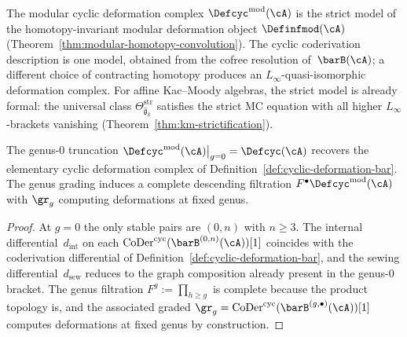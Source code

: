\begin{remark}
\label{rem:modular-cyc-strictification}
The modular cyclic deformation complex $\Defcyc^{\mathrm{mod}}(\cA)$
is the strict model of the homotopy-invariant modular deformation
object $\Definfmod(\cA)$
\textup{(}Theorem~\textup{\ref{thm:modular-homotopy-convolution})}.
The cyclic coderivation description is one model, obtained from the
cofree resolution of~$\barB(\cA)$; a different choice of
contracting homotopy produces an $L_\infty$-quasi-isomorphic
deformation complex. For affine Kac--Moody algebras, the
strict model is already formal: the universal class
$\Theta^{\mathrm{str}}_{\widehat{\mathfrak{g}}_k}$ satisfies the strict
MC equation with all higher $L_\infty$-brackets vanishing
\textup{(}Theorem~\textup{\ref{thm:km-strictification})}.
\end{remark}

\begin{proposition}
\label{prop:modular-deformation-truncation}
The genus-$0$ truncation
$\Defcyc^{\mathrm{mod}}(\cA)\big|_{g=0} = \Defcyc(\cA)$
recovers the elementary cyclic deformation complex of
Definition~\textup{\ref{def:cyclic-deformation-bar}}.
The genus grading induces a complete descending filtration
$F^{\bullet}\Defcyc^{\mathrm{mod}}(\cA)$ with
$\gr_g$ computing deformations at fixed genus.
\end{proposition}

\begin{proof}
At $g = 0$ the only stable pairs are $(0,n)$ with $n \geq 3$.
The internal differential~$d_{\mathrm{int}}$ on each
$\operatorname{CoDer}^{\mathrm{cyc}}(\barB^{(0,n)}(\cA))[1]$
coincides with the coderivation differential of
Definition~\ref{def:cyclic-deformation-bar}, and the sewing
differential~$d_{\mathrm{sew}}$ reduces to the graph composition
already present in the genus-$0$ bracket.
The genus filtration $F^g := \prod_{h \geq g}$ is complete because
the product topology is, and the associated graded
$\gr_g = \operatorname{CoDer}^{\mathrm{cyc}}(\barB^{(g,\bullet)}(\cA))[1]$
computes deformations at fixed genus by construction.
\end{proof}


